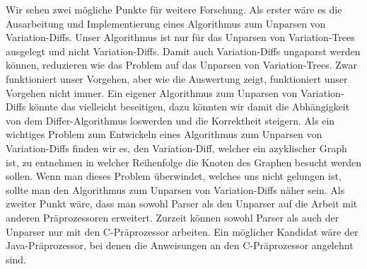 Wir sehen zwei mögliche Punkte für weitere Forschung. Als erster wäre es die Ausarbeitung und Implementierung eines Algorithmus zum Unparsen von Variation-Diffs. Unser Algorithmus ist nur für das Unparsen von Variation-Trees ausgelegt und nicht Variation-Diffs. Damit auch Variation-Diffs ungaparst werden können, reduzieren wie das Problem auf das Unparsen von Variation-Trees. Zwar funktioniert unser Vorgehen, aber wie die Auswertung zeigt, funktioniert unser Vorgehen nicht immer. Ein eigener Algorithmus zum Unparsen von Variation-Diffs könnte das vielleicht beseitigen, dazu könnten wir damit die Abhängigkeit von dem Differ-Algorithmus loswerden und die Korrektheit steigern. Als ein wichtiges Problem zum Entwickeln eines Algorithmus zum Unparsen von Variation-Diffs finden wir es, den Variation-Diff, welcher ein azyklischer Graph ist, zu entnehmen in welcher Reihenfolge die Knoten des Graphen besucht werden sollen. Wenn man dieses Problem überwindet, welches uns nicht gelungen ist, sollte man den Algorithmus zum Unparsen von Variation-Diffs näher sein. Als zweiter Punkt wäre, dass man sowohl Parser als den Unparser auf die Arbeit mit anderen Präprozessoren erweitert. Zurzeit können sowohl Parser als auch der Unparser nur mit den C-Präprozessor arbeiten. Ein möglicher Kandidat wäre der Java-Präprozessor, bei denen die Anweisungen an den C-Präprozessor angelehnt sind. 












